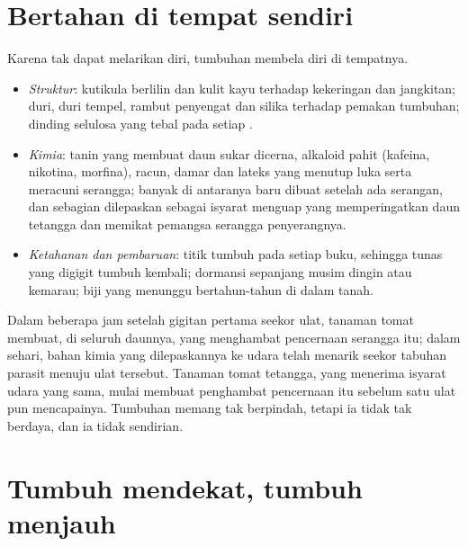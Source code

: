\section{Bertahan di tempat sendiri}

\begin{proposition}\label{prop:g12:plant-rooted-life:defences}
Karena tak dapat melarikan diri, tumbuhan membela diri di tempatnya.
\begin{itemize}
  \item \emph{Struktur}: kutikula berlilin dan kulit kayu terhadap
        kekeringan dan jangkitan; duri, duri tempel, rambut penyengat
        dan silika terhadap pemakan tumbuhan; dinding selulosa yang
        tebal pada setiap .
  \item \emph{Kimia}: tanin yang membuat daun sukar dicerna, alkaloid
        pahit (kafeina, nikotina, morfina), racun, damar dan lateks
        yang menutup luka serta meracuni serangga; banyak di antaranya
        baru dibuat setelah ada serangan, dan sebagian dilepaskan
        sebagai isyarat menguap yang memperingatkan daun tetangga dan
        memikat pemangsa serangga penyerangnya.
  \item \emph{Ketahanan dan pembaruan}: titik tumbuh pada setiap buku,
        sehingga tunas yang digigit tumbuh kembali; dormansi sepanjang
        musim dingin atau kemarau; biji yang menunggu bertahun-tahun
        di dalam tanah.
\end{itemize}
\end{proposition}
\admitted

\begin{example}\label{ex:g12:plant-rooted-life:caterpillar}
Dalam beberapa jam setelah gigitan pertama seekor ulat, tanaman tomat
membuat, di seluruh daunnya,  yang menghambat  pencernaan
serangga itu; dalam sehari, bahan kimia yang dilepaskannya ke udara
telah menarik seekor tabuhan parasit menuju ulat tersebut. Tanaman
tomat tetangga, yang menerima isyarat udara yang sama, mulai membuat
penghambat pencernaan itu sebelum satu ulat pun mencapainya. Tumbuhan
memang tak berpindah, tetapi ia tidak tak berdaya, dan ia tidak
sendirian.
\end{example}

\section{Tumbuh mendekat, tumbuh menjauh}

